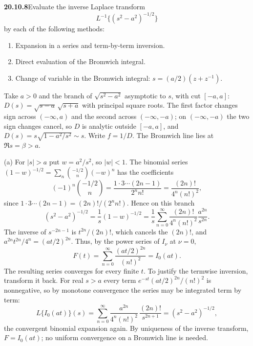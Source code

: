 \par\bigskip
\noindent\textbf{20.10.8}\quad Evaluate the inverse Laplace
transform
\[
L^{-1}\big\{(s^{2}-a^{2})^{-1/2}\big\}
\]
by each of the following methods:
\begin{enumerate}
\item[(a)] Expansion in a series and term-by-term inversion.
\item[(b)] Direct evaluation of the Bromwich integral.
\item[(c)] Change of variable in the Bromwich integral:
$s=(a/2)(z+z^{-1})$.
\end{enumerate}
\solution
Take $a>0$ and the branch of
$\sqrt{s^2-a^2}$ asymptotic to $s$, with cut $[-a,a]$:
$D(s)=\sqrt{s-a}\,\sqrt{s+a}$ with principal square roots.
The first factor changes sign across $(-\infty,a)$ and the
second across $(-\infty,-a)$; on $(-\infty,-a)$ the two sign
changes cancel, so $D$ is analytic outside $[-a,a]$, and
$D(s)=s\sqrt{1-a^2/s^2}\sim s$. Write $f=1/D$.
The Bromwich line lies at $\Re s=\beta>a$.

(a) For $|s|>a$ put $w=a^2/s^2$, so $|w|<1$. The binomial
series $(1-w)^{-1/2}=\sum_n\binom{-1/2}{n}(-w)^n$ has the
coefficients
\[
(-1)^n\binom{-1/2}{n}=\frac{1\cdot3\cdots(2n-1)}{2^nn!}
=\frac{(2n)!}{4^n(n!)^2},
\]
since $1\cdot3\cdots(2n-1)=(2n)!/(2^nn!)$. Hence on this branch
\[
(s^2-a^2)^{-1/2}=\frac1s(1-w)^{-1/2}
=\frac1s\sum_{n=0}^\infty
\frac{(2n)!}{4^n(n!)^2}\frac{a^{2n}}{s^{2n}}.
\]
The inverse of $s^{-2n-1}$ is $t^{2n}/(2n)!$, which cancels
the $(2n)!$, and $a^{2n}t^{2n}/4^n=(at/2)^{2n}$. Thus, by the
power series of $I_\nu$ at $\nu=0$,
\[
F(t)=\sum_{n=0}^\infty
\frac{(at/2)^{2n}}{(n!)^2}=\boxed{I_0(at)}.
\]
The resulting series converges for every finite $t$.
To justify the termwise inversion, transform it back. For
real $s>a$ every term $e^{-st}(at/2)^{2n}/(n!)^2$ is
nonnegative, so by monotone convergence the series may be
integrated term by term:
\[
L\{I_0(at)\}(s)=\sum_{n=0}^\infty\frac{a^{2n}}{4^n(n!)^2}\,
\frac{(2n)!}{s^{2n+1}}=(s^2-a^2)^{-1/2},
\]
the convergent binomial expansion again. By uniqueness of
the inverse transform, $F=I_0(at)$; no uniform convergence on
a Bromwich line is needed.

